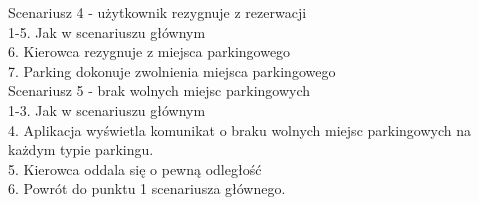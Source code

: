 \noindent Scenariusz 4 - użytkownik rezygnuje z rezerwacji \\
\hspace*{1cm} 1-5. Jak w scenariuszu głównym \\
\hspace*{1cm} 6. Kierowca rezygnuje z miejsca parkingowego \\
\hspace*{1cm} 7. Parking dokonuje zwolnienia miejsca parkingowego \\



\noindent Scenariusz 5 - brak wolnych miejsc parkingowych \\
\hspace*{1cm} 1-3. 	Jak w scenariuszu głównym \\
\hspace*{1cm} 4.	Aplikacja wyświetla komunikat o braku wolnych miejsc parkingowych na każdym typie parkingu. \\
\hspace*{1cm} 5. Kierowca oddala się o pewną odległość \\
\hspace*{1cm} 6. Powrót do punktu 1 scenariusza głównego. \\
